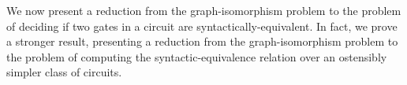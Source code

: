 \documentclass[../paper.tex]{subfiles}
\begin{document}


We now present a reduction from the graph-isomorphism problem to the problem of
deciding if two gates in a circuit are syntactically-equivalent. In fact, we
prove a stronger result, presenting a reduction from the graph-isomorphism
problem to the problem of computing the syntactic-equivalence relation over an
ostensibly simpler class of circuits.
\end{document}
